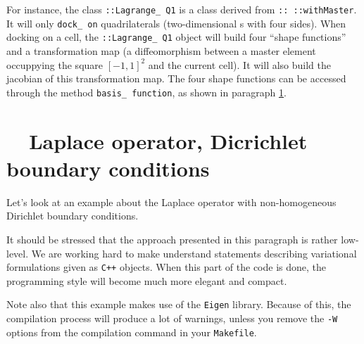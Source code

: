 For instance, the class {\small\tt {}::Lagrange\_\,Q1} is a class derived from
{\small\tt {}:: ::withMaster}.
It will only {\small\tt dock\_\,on} quadrilaterals (two-dimensional {\small\tt {}}s
with four sides).
When docking on a cell, the {\small\tt {}::Lagrange\_\,Q1} object will build four
``shape functions'' and a transformation map (a diffeomorphism between a master element
occuppying the square $ [-1, 1]^2 $ and the current cell).
It will also build the jacobian of this transformation map.
The four shape functions can be accessed through the method {\small\tt basis\_\,function},
as shown in paragraph \ref{\numb section 6.\numb parag 2}.


\section{~~Laplace operator, Dicrichlet boundary conditions}\label{\numb section 6.\numb parag 2}

Let's look at an example about the Laplace operator with non-homogeneous Dirichlet
boundary conditions.

It should be stressed that the approach presented in this paragraph is rather low-level.
We are working hard to make {\maniFEM} understand statements describing variational
formulations given as {\tt C++} objects.
When this part of the code is done, the programming style will become much more elegant
and compact.

Note also that this example makes use of the {\small\tt Eigen} library.
Because of this, the compilation process will produce a lot of warnings,
unless you remove the {\small\tt -W} options from the compilation command in your
{\small\tt Makefile}.


